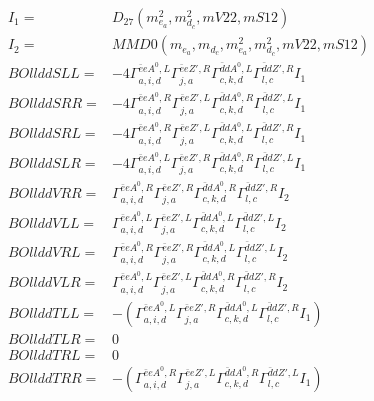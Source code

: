 \documentclass[A4,landscape]{article}
\begin{document}
\begin{align} 
I_1 = & D_{27}(m^2_{e_{{a}}}, m^2_{d_{{c}}}, mV22, mS12) \\ 
I_2 = & MMD0(m_{e_{{a}}}, m_{d_{{c}}}, m^2_{e_{{a}}}, m^2_{d_{{c}}}, mV22, mS12) \\ 
  BOllddSLL= & -4  \Gamma^{\bar{e}e A^0 ,L}_{a, i, d} \Gamma^{\bar{e}e {Z'} ,R}_{j, a} \Gamma^{\bar{d}d A^0 ,L}_{c, k, d} \Gamma^{\bar{d}d {Z'} ,R}_{l, c} I_1 \\ 
  BOllddSRR= & -4  \Gamma^{\bar{e}e A^0 ,R}_{a, i, d} \Gamma^{\bar{e}e {Z'} ,L}_{j, a} \Gamma^{\bar{d}d A^0 ,R}_{c, k, d} \Gamma^{\bar{d}d {Z'} ,L}_{l, c} I_1 \\ 
  BOllddSRL= & -4  \Gamma^{\bar{e}e A^0 ,R}_{a, i, d} \Gamma^{\bar{e}e {Z'} ,L}_{j, a} \Gamma^{\bar{d}d A^0 ,L}_{c, k, d} \Gamma^{\bar{d}d {Z'} ,R}_{l, c} I_1 \\ 
  BOllddSLR= & -4  \Gamma^{\bar{e}e A^0 ,L}_{a, i, d} \Gamma^{\bar{e}e {Z'} ,R}_{j, a} \Gamma^{\bar{d}d A^0 ,R}_{c, k, d} \Gamma^{\bar{d}d {Z'} ,L}_{l, c} I_1 \\ 
  BOllddVRR= &  \Gamma^{\bar{e}e A^0 ,R}_{a, i, d} \Gamma^{\bar{e}e {Z'} ,R}_{j, a} \Gamma^{\bar{d}d A^0 ,R}_{c, k, d} \Gamma^{\bar{d}d {Z'} ,R}_{l, c} I_2 \\ 
  BOllddVLL= &  \Gamma^{\bar{e}e A^0 ,L}_{a, i, d} \Gamma^{\bar{e}e {Z'} ,L}_{j, a} \Gamma^{\bar{d}d A^0 ,L}_{c, k, d} \Gamma^{\bar{d}d {Z'} ,L}_{l, c} I_2 \\ 
  BOllddVRL= &  \Gamma^{\bar{e}e A^0 ,R}_{a, i, d} \Gamma^{\bar{e}e {Z'} ,R}_{j, a} \Gamma^{\bar{d}d A^0 ,L}_{c, k, d} \Gamma^{\bar{d}d {Z'} ,L}_{l, c} I_2 \\ 
  BOllddVLR= &  \Gamma^{\bar{e}e A^0 ,L}_{a, i, d} \Gamma^{\bar{e}e {Z'} ,L}_{j, a} \Gamma^{\bar{d}d A^0 ,R}_{c, k, d} \Gamma^{\bar{d}d {Z'} ,R}_{l, c} I_2 \\ 
  BOllddTLL= & -( \Gamma^{\bar{e}e A^0 ,L}_{a, i, d} \Gamma^{\bar{e}e {Z'} ,R}_{j, a} \Gamma^{\bar{d}d A^0 ,L}_{c, k, d} \Gamma^{\bar{d}d {Z'} ,R}_{l, c} I_1) \\ 
  BOllddTLR= & 0 \\ 
  BOllddTRL= & 0 \\ 
  BOllddTRR= & -( \Gamma^{\bar{e}e A^0 ,R}_{a, i, d} \Gamma^{\bar{e}e {Z'} ,L}_{j, a} \Gamma^{\bar{d}d A^0 ,R}_{c, k, d} \Gamma^{\bar{d}d {Z'} ,L}_{l, c} I_1) \\ 
\end{align} 
\end{document}
